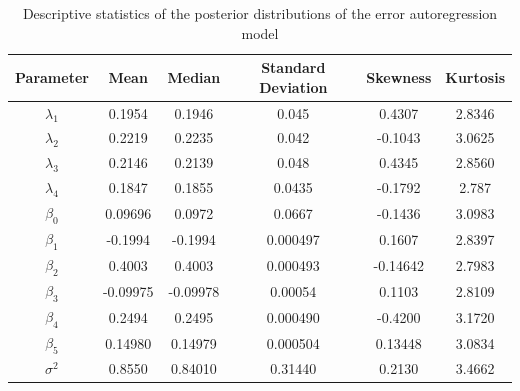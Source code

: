 \documentclass[times, doublespace]{auth}
\begin{document}
\begin{table}
	\centering
	\caption{Descriptive statistics of the posterior distributions of the error autoregression model}
	\label{table1c}
	\begin{tabular}{|c|c|c|c|c|c|}
		\hline
		Parameter & Mean & Median & Standard Deviation & Skewness & Kurtosis\\
		\hline
		$\lambda_{1}$ & 0.1954 & 0.1946 & 0.045 & 0.4307 & 2.8346\\
		\hline
		$\lambda_{2}$ & 0.2219 & 0.2235 & 0.042 & -0.1043 & 3.0625\\
		\hline
		$\lambda_{3}$ & 0.2146 & 0.2139 & 0.048 & 0.4345 & 2.8560\\
		\hline
		$\lambda_{4}$ & 0.1847 & 0.1855 & 0.0435 & -0.1792 & 2.787\\
		\hline
		$\beta_{0}$ & 0.09696 & 0.0972 & 0.0667 & -0.1436 & 3.0983\\
		\hline
		$\beta_{1}$ & -0.1994 & -0.1994 & 0.000497 & 0.1607 & 2.8397\\
		\hline
		$\beta_{2}$ & 0.4003 & 0.4003 & 0.000493 & -0.14642 & 2.7983\\
		\hline
		$\beta_{3}$ & -0.09975 & -0.09978 & 0.00054 & 0.1103 & 2.8109\\
		\hline
		$\beta_{4}$ & 0.2494 & 0.2495 & 0.000490 & -0.4200 & 3.1720\\
		\hline
		$\beta_{5}$ & 0.14980 & 0.14979 & 0.000504 & 0.13448 & 3.0834\\
		\hline
		$\sigma^{2}$ & 0.8550 & 0.84010 & 0.31440 & 0.2130 & 3.4662\\
		\hline
	\end{tabular}
\end{table}
\end{document}
